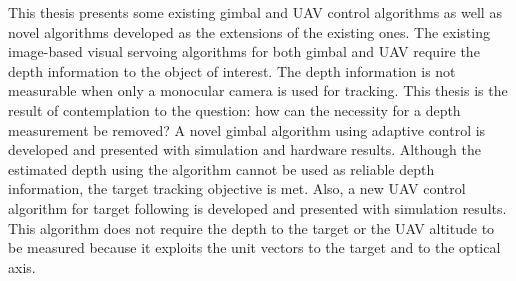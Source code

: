 \afterpage{\cleardoublepage}
This thesis presents some existing gimbal and UAV control algorithms as well as novel algorithms developed as the extensions of the existing ones. The existing image-based visual servoing algorithms for both gimbal and UAV require the depth information to the object of interest. The depth information is not measurable when only a monocular camera is used for tracking. This thesis is the result of contemplation to the question: how can the necessity for a depth measurement be removed? 
A novel gimbal algorithm using adaptive control is developed and presented with simulation and hardware results. Although the estimated depth using the algorithm cannot be used as reliable depth information, the target tracking objective is met.
Also, a new UAV control algorithm for target following is developed and presented with simulation results. This algorithm does not require the depth to the target or the UAV altitude to be measured because it exploits the unit vectors to the target and to the optical axis. 